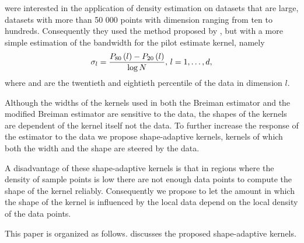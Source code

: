 \textcite{ferdosi2011comparison} were interested in the application of density estimation on datasets that are large, \ie datasets with more than 50 000 points with dimension ranging from ten to hundreds. Consequently they used the method proposed by \citeauthor{wilkinson1995dataplot}, but with a more simple estimation of the bandwidth for the pilot estimate kernel, namely 
	\begin{equation}
		\sigma_l = \frac{P_{80}\left( l \right) - P_{20}\left( l \right)}{\log N}, \, l = 1, \dotsc, d,
	\end{equation}
where  and  are the twentieth and eightieth percentile of the data in dimension $l$. 

Although the widths of the kernels used in both the Breiman estimator and the modified Breiman estimator are sensitive to the data, the shapes of the kernels are dependent of the kernel itself not the data. To further increase the response of the estimator to the data we propose shape-adaptive kernels, kernels of which both the width and the shape are steered by the data. 

A disadvantage of these shape-adaptive kernels is that in regions where the density of sample points is low there are not enough data points to compute the shape of the kernel reliably. Consequently we propose to let the amount in which the shape of the kernel is influenced by the local data depend on the local density of the data points.

This paper is organized as follows.  discusses the proposed shape-adaptive kernels. 